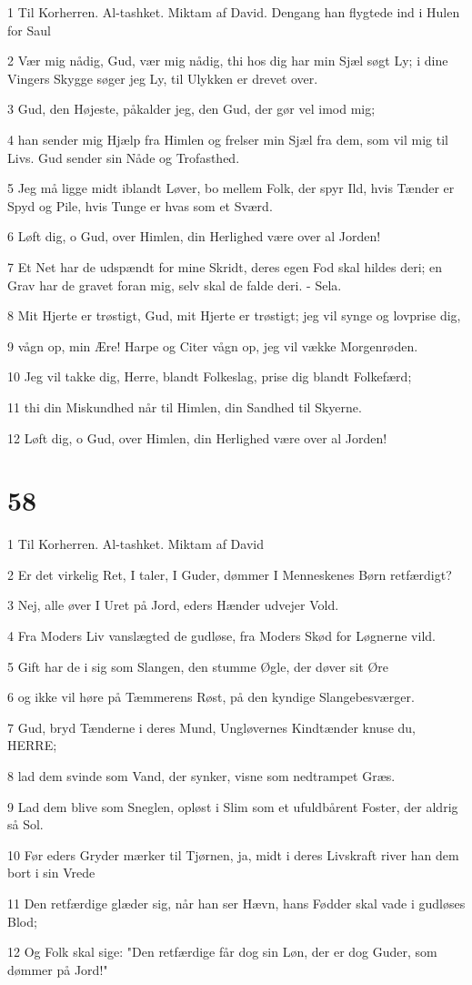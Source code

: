 \par 1 Til Korherren. Al-tashket. Miktam af David. Dengang han flygtede ind i Hulen for Saul
\par 2 Vær mig nådig, Gud, vær mig nådig, thi hos dig har min Sjæl søgt Ly; i dine Vingers Skygge søger jeg Ly, til Ulykken er drevet over.
\par 3 Gud, den Højeste, påkalder jeg, den Gud, der gør vel imod mig;
\par 4 han sender mig Hjælp fra Himlen og frelser min Sjæl fra dem, som vil mig til Livs. Gud sender sin Nåde og Trofasthed.
\par 5 Jeg må ligge midt iblandt Løver, bo mellem Folk, der spyr Ild, hvis Tænder er Spyd og Pile, hvis Tunge er hvas som et Sværd.
\par 6 Løft dig, o Gud, over Himlen, din Herlighed være over al Jorden!
\par 7 Et Net har de udspændt for mine Skridt, deres egen Fod skal hildes deri; en Grav har de gravet foran mig, selv skal de falde deri. - Sela.
\par 8 Mit Hjerte er trøstigt, Gud, mit Hjerte er trøstigt; jeg vil synge og lovprise dig,
\par 9 vågn op, min Ære! Harpe og Citer vågn op, jeg vil vække Morgenrøden.
\par 10 Jeg vil takke dig, Herre, blandt Folkeslag, prise dig blandt Folkefærd;
\par 11 thi din Miskundhed når til Himlen, din Sandhed til Skyerne.
\par 12 Løft dig, o Gud, over Himlen, din Herlighed være over al Jorden!

\chapter{58}

\par 1 Til Korherren. Al-tashket. Miktam af David
\par 2 Er det virkelig Ret, I taler, I Guder, dømmer I Menneskenes Børn retfærdigt?
\par 3 Nej, alle øver I Uret på Jord, eders Hænder udvejer Vold.
\par 4 Fra Moders Liv vanslægted de gudløse, fra Moders Skød for Løgnerne vild.
\par 5 Gift har de i sig som Slangen, den stumme Øgle, der døver sit Øre
\par 6 og ikke vil høre på Tæmmerens Røst, på den kyndige Slangebesværger.
\par 7 Gud, bryd Tænderne i deres Mund, Ungløvernes Kindtænder knuse du, HERRE;
\par 8 lad dem svinde som Vand, der synker, visne som nedtrampet Græs.
\par 9 Lad dem blive som Sneglen, opløst i Slim som et ufuldbårent Foster, der aldrig så Sol.
\par 10 Før eders Gryder mærker til Tjørnen, ja, midt i deres Livskraft river han dem bort i sin Vrede
\par 11 Den retfærdige glæder sig, når han ser Hævn, hans Fødder skal vade i gudløses Blod;
\par 12 Og Folk skal sige: "Den retfærdige får dog sin Løn, der er dog Guder, som dømmer på Jord!"

